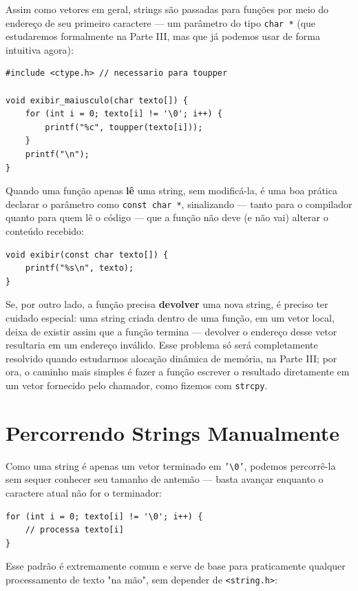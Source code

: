 Assim como vetores em geral, strings são passadas para funções por meio do endereço de seu primeiro caractere — um parâmetro do tipo \texttt{char *} (que estudaremos formalmente na Parte III, mas que já podemos usar de forma intuitiva agora):

\begin{lstlisting}
#include <ctype.h> // necessario para toupper

void exibir_maiusculo(char texto[]) {
    for (int i = 0; texto[i] != '\0'; i++) {
        printf("%c", toupper(texto[i]));
    }
    printf("\n");
}
\end{lstlisting}

Quando uma função apenas \textbf{lê} uma string, sem modificá-la, é uma boa prática declarar o parâmetro como \texttt{const char *}, sinalizando — tanto para o compilador quanto para quem lê o código — que a função não deve (e não vai) alterar o conteúdo recebido:

\begin{lstlisting}
void exibir(const char texto[]) {
    printf("%s\n", texto);
}
\end{lstlisting}

Se, por outro lado, a função precisa \textbf{devolver} uma nova string, é preciso ter cuidado especial: uma string criada dentro de uma função, em um vetor local, deixa de existir assim que a função termina — devolver o endereço desse vetor resultaria em um endereço inválido. Esse problema só será completamente resolvido quando estudarmos alocação dinâmica de memória, na Parte III; por ora, o caminho mais simples é fazer a função escrever o resultado diretamente em um vetor fornecido pelo chamador, como fizemos com \texttt{strcpy}.

\section{Percorrendo Strings Manualmente}

Como uma string é apenas um vetor terminado em \texttt{'\textbackslash 0'}, podemos percorrê-la sem sequer conhecer seu tamanho de antemão — basta avançar enquanto o caractere atual não for o terminador:

\begin{lstlisting}
for (int i = 0; texto[i] != '\0'; i++) {
    // processa texto[i]
}
\end{lstlisting}

Esse padrão é extremamente comum e serve de base para praticamente qualquer processamento de texto "na mão", sem depender de \texttt{<string.h>}:

